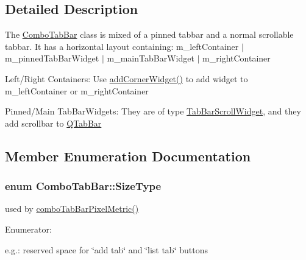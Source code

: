 \subsection{Detailed Description}
The \hyperlink{class_combo_tab_bar}{ComboTabBar} class is mixed of a pinned tabbar and a normal scrollable tabbar. It has a horizontal layout containing: m\_\-leftContainer $|$ m\_\-pinnedTabBarWidget $|$ m\_\-mainTabBarWidget $|$ m\_\-rightContainer


\begin{DoxyItemize}
\item Left/Right Containers: Use \hyperlink{class_combo_tab_bar_a3371dbfa9365711b28f7440dbd4d36e6}{addCornerWidget()} to add widget to m\_\-leftContainer or m\_\-rightContainer
\end{DoxyItemize}


\begin{DoxyItemize}
\item Pinned/Main TabBarWidgets: They are of type \hyperlink{class_tab_bar_scroll_widget}{TabBarScrollWidget}, and they add scrollbar to \hyperlink{class_q_tab_bar}{QTabBar} 
\end{DoxyItemize}

\subsection{Member Enumeration Documentation}
\hypertarget{class_combo_tab_bar_a1b4d1e5b7dbc95dcf040b481e00760bc}{
\subsubsection[{SizeType}]{\setlength{\rightskip}{0pt plus 5cm}enum {\bf ComboTabBar::SizeType}}}
\label{class_combo_tab_bar_a1b4d1e5b7dbc95dcf040b481e00760bc}


used by \hyperlink{class_combo_tab_bar_abfe5f8784d0433283bca4c087f0d2b42}{comboTabBarPixelMetric()} 

\begin{Desc}
\item[Enumerator: ]\par
\begin{description}
\item[{\em 
\hypertarget{class_combo_tab_bar_a1b4d1e5b7dbc95dcf040b481e00760bcaad4e405225830026a514d146b600b955}{
ExtraReservedWidth}
\label{class_combo_tab_bar_a1b4d1e5b7dbc95dcf040b481e00760bcaad4e405225830026a514d146b600b955}
}]e.g.: reserved space for \char`\"{}add tab\char`\"{} and \char`\"{}list tab\char`\"{} buttons \end{description}
\end{Desc}



